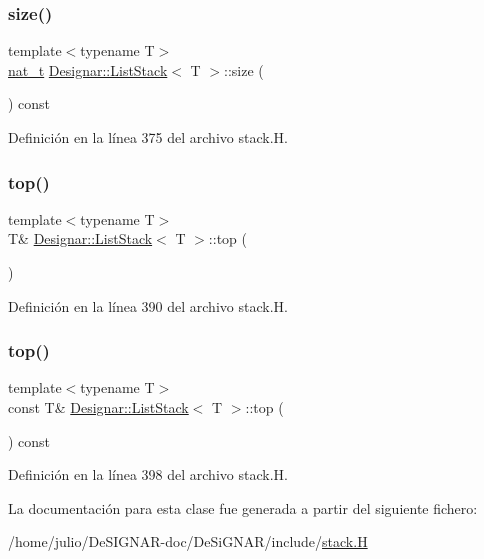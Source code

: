 \subsubsection{\texorpdfstring{size()}{size()}}
{\footnotesize\ttfamily template$<$typename T$>$ \\
\hyperlink{namespace_designar_aa72662848b9f4815e7bf31a7cf3e33d1}{nat\+\_\+t} \hyperlink{class_designar_1_1_list_stack}{Designar\+::\+List\+Stack}$<$ T $>$\+::size (\begin{DoxyParamCaption}{ }\end{DoxyParamCaption}) const\hspace{0.3cm}{\ttfamily [inline]}}



Definición en la línea 375 del archivo stack.\+H.

\mbox{\label{class_designar_1_1_list_stack_a5b6e47be80da93039d31cd885e97cf34}} 
\subsubsection{\texorpdfstring{top()}{top()}\hspace{0.1cm}{\footnotesize\ttfamily [1/2]}}
{\footnotesize\ttfamily template$<$typename T$>$ \\
T\& \hyperlink{class_designar_1_1_list_stack}{Designar\+::\+List\+Stack}$<$ T $>$\+::top (\begin{DoxyParamCaption}{ }\end{DoxyParamCaption})\hspace{0.3cm}{\ttfamily [inline]}}



Definición en la línea 390 del archivo stack.\+H.

\mbox{\label{class_designar_1_1_list_stack_a6eafdfa1a1a43b4cbbe27730a7dcffd3}} 
\subsubsection{\texorpdfstring{top()}{top()}\hspace{0.1cm}{\footnotesize\ttfamily [2/2]}}
{\footnotesize\ttfamily template$<$typename T$>$ \\
const T\& \hyperlink{class_designar_1_1_list_stack}{Designar\+::\+List\+Stack}$<$ T $>$\+::top (\begin{DoxyParamCaption}{ }\end{DoxyParamCaption}) const\hspace{0.3cm}{\ttfamily [inline]}}



Definición en la línea 398 del archivo stack.\+H.



La documentación para esta clase fue generada a partir del siguiente fichero\+:\begin{DoxyCompactItemize}
\item 
/home/julio/\+De\+S\+I\+G\+N\+A\+R-\/doc/\+De\+Si\+G\+N\+A\+R/include/\hyperlink{stack_8_h}{stack.\+H}\end{DoxyCompactItemize}
